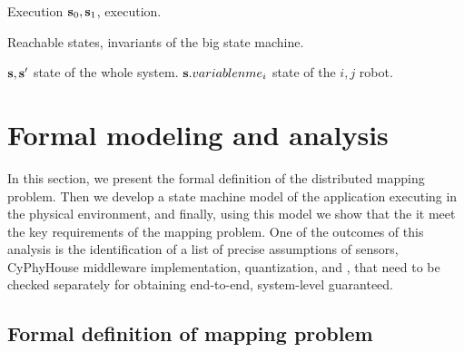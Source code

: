 

Execution ${\bf  s}_0, {\bf s}_1$, execution. 

Reachable states, invariants of the big state machine. 

${\bf s},{\bf  s'}$ state of the whole system. 
${\bf s}.variablenme_i$ state of the $i,j$ robot. 




\section{Formal modeling and analysis}
\label{sec:formal}

In this section, we present the formal definition of the distributed mapping problem. Then we develop a state machine model of the \dmap application executing in the physical environment, and finally, using this model we show that the it meet the key requirements of the mapping problem. One of the outcomes of this analysis is the identification of a list of precise 
 assumptions of sensors, CyPhyHouse middleware implementation, quantization, and , that need to be checked separately for obtaining end-to-end, system-level guaranteed. 
 
\subsection{Formal definition of mapping problem}
\label{sec:prelims}

